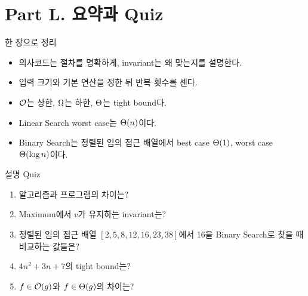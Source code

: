 \section{Part L. 요약과 Quiz}

\begin{frame}{한 장으로 정리}
  \begin{center}
  \end{center}
  \begin{itemize}
    \item 의사코드는 절차를 명확하게, invariant는 왜 맞는지를 설명한다.
    \item 입력 크기와 기본 연산을 정한 뒤 반복 횟수를 센다.
    \item $\mathcal{O}$는 상한, $\Omega$는 하한, $\Theta$는 tight bound다.
    \item Linear Search worst case는 $\Theta(n)$이다.
    \item Binary Search는 정렬된 임의 접근 배열에서 best case $\Theta(1)$, worst case $\Theta(\log n)$이다.
  \end{itemize}
\end{frame}

\begin{frame}{설명 Quiz}
  \large
  \setlength{\itemsep}{1mm}
  \begin{enumerate}
    \item 알고리즘과 프로그램의 차이는?
    \item Maximum에서 $v$가 유지하는 invariant는?
    \item 정렬된 임의 접근 배열 $[2,5,8,12,16,23,38]$에서 16을 Binary Search로 찾을 때 비교하는 값들은?
    \item $4n^2+3n+7$의 tight bound는?
    \item $f\in\mathcal{O}(g)$와 $f\in\Theta(g)$의 차이는?
  \end{enumerate}
  \vfill
\end{frame}

